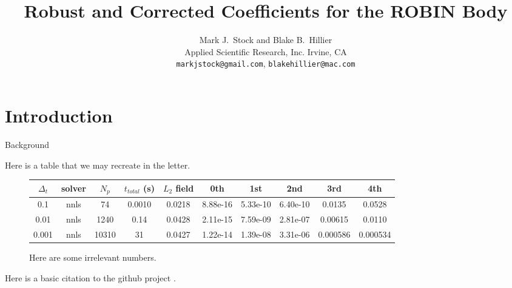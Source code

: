 \documentclass[12pt]{article}
\title{Robust and Corrected Coefficients for the ROBIN Body}
\author{Mark J.~Stock and Blake B.~Hillier\\
        Applied Scientific Research, Inc.
        Irvine, CA\\
        \texttt{markjstock@gmail.com}, \texttt{blakehillier@mac.com}
}
\begin{document}
\maketitle



\section{Introduction}
Background

Here is a table that we may recreate in the letter.

\begin{figure} \begin{centering}
\begin{small}
\begin{tabular}{cccccccccc}
$\Delta_t$ & solver & $N_p$ & $t_{total}$ (s) & $L_2$ field & 0th & 1st & 2nd & 3rd & 4th \\
\hline
0.1 & nnls & 74 & 0.0010 & 0.0218 & 8.88e-16 & 5.33e-10 & 6.40e-10 & 0.0135 & 0.0528 \\
\hline
0.01 & nnls & 1240 & 0.14 & 0.0428 & 2.11e-15 & 7.59e-09 & 2.81e-07 & 0.00615 & 0.0110 \\
\hline
0.001 & nnls & 10310 & 31 & 0.0427 & 1.22e-14 & 1.39e-08 & 3.31e-06 & 0.000586 & 0.000534 \\
\end{tabular}
\caption{Here are some irrelevant numbers. }
\label{solverres}
\end{small}
\end{centering}\end{figure}%

Here is a basic citation to the github project \cite{robinsurfmesh}.
\end{document}
